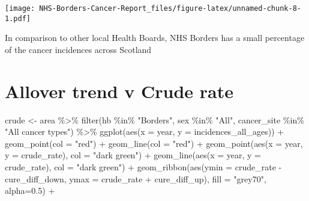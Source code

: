 \documentclass[
]{article}
\newenvironment{Shaded}{\begin{snugshade}}{\end{snugshade}}
\newcommand{\AttributeTok}[1]{\textcolor[rgb]{0.77,0.63,0.00}{#1}}
\newcommand{\FloatTok}[1]{\textcolor[rgb]{0.00,0.00,0.81}{#1}}
\newcommand{\FunctionTok}[1]{\textcolor[rgb]{0.00,0.00,0.00}{#1}}
\newcommand{\NormalTok}[1]{#1}
\newcommand{\OtherTok}[1]{\textcolor[rgb]{0.56,0.35,0.01}{#1}}
\newcommand{\SpecialCharTok}[1]{\textcolor[rgb]{0.00,0.00,0.00}{#1}}
\newcommand{\StringTok}[1]{\textcolor[rgb]{0.31,0.60,0.02}{#1}}
\begin{document}
\texttt{[image: NHS-Borders-Cancer-Report\_files/figure-latex/unnamed-chunk-8-1.pdf]}

In comparison to other local Health Boards, NHS Borders has a small
percentage of the cancer incidences across Scotland

\hypertarget{allover-trend-v-crude-rate}{%
\section{Allover trend v Crude rate}\label{allover-trend-v-crude-rate}}

\begin{Shaded}
\begin{Highlighting}[]
\NormalTok{crude }\OtherTok{\textless{}{-}}\NormalTok{ area }\SpecialCharTok{\%\textgreater{}\%} 
  \FunctionTok{filter}\NormalTok{(hb }\SpecialCharTok{\%in\%} \StringTok{"Borders"}\NormalTok{,}
\NormalTok{         sex }\SpecialCharTok{\%in\%} \StringTok{"All"}\NormalTok{,}
\NormalTok{         cancer\_site }\SpecialCharTok{\%in\%} \StringTok{"All cancer types"}\NormalTok{) }\SpecialCharTok{\%\textgreater{}\%} 
  \FunctionTok{ggplot}\NormalTok{(}\FunctionTok{aes}\NormalTok{(}\AttributeTok{x =}\NormalTok{ year, }\AttributeTok{y =}\NormalTok{ incidences\_all\_ages)) }\SpecialCharTok{+}
  \FunctionTok{geom\_point}\NormalTok{(}\AttributeTok{col =} \StringTok{"red"}\NormalTok{) }\SpecialCharTok{+}
  \FunctionTok{geom\_line}\NormalTok{(}\AttributeTok{col =} \StringTok{"red"}\NormalTok{) }\SpecialCharTok{+}
  \FunctionTok{geom\_point}\NormalTok{(}\FunctionTok{aes}\NormalTok{(}\AttributeTok{x =}\NormalTok{ year, }\AttributeTok{y =}\NormalTok{ crude\_rate),}
             \AttributeTok{col =} \StringTok{"dark green"}\NormalTok{) }\SpecialCharTok{+}
  \FunctionTok{geom\_line}\NormalTok{(}\FunctionTok{aes}\NormalTok{(}\AttributeTok{x =}\NormalTok{ year, }\AttributeTok{y =}\NormalTok{ crude\_rate),}
            \AttributeTok{col =} \StringTok{"dark green"}\NormalTok{) }\SpecialCharTok{+}
  \FunctionTok{geom\_ribbon}\NormalTok{(}\FunctionTok{aes}\NormalTok{(}\AttributeTok{ymin =}\NormalTok{ crude\_rate }\SpecialCharTok{{-}}\NormalTok{ cure\_diff\_down, }
                  \AttributeTok{ymax =}\NormalTok{ crude\_rate }\SpecialCharTok{+}\NormalTok{ cure\_diff\_up), }
              \AttributeTok{fill =} \StringTok{"grey70"}\NormalTok{, }\AttributeTok{alpha=}\FloatTok{0.5}\NormalTok{) }\SpecialCharTok{+}
  

\end{Highlighting}
\end{Shaded}
\end{document}

